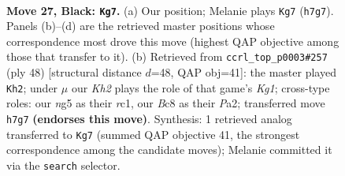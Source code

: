 \documentclass[11pt]{article}
\begin{document}
\clearpage

\begin{figure}[p]\centering
\begin{subfigure}{0.46\textwidth}\centering
\resizebox{\linewidth}{!}{%
\newchessgame
\chessboard[
  setfen={r1b4r/7k/p1n3p1/p3PpNp/n1B2B2/P5P1/1P3P1P/RK1R4 b - - 2 27},
  showmover=false,
  pgfstyle=straightmove, color=movearrow, markmove={h7-g7}
]}
\caption{}
\end{subfigure}\hfill
\begin{subfigure}{0.46\textwidth}\centering
\resizebox{\linewidth}{!}{%
\newchessgame
\chessboard[
  setfen={r4k2/pp2pp2/n5p1/3PNb1p/8/4R1PP/P2RPPB1/2r3K1 w - - 3 25},
  showmover=false,
  pgfstyle=straightmove, color=movearrow, markmove={g1-h2}
]}
\caption{}
\end{subfigure}
\\[4pt]

\caption{\textbf{Move 27, Black: \texttt{Kg7}.} (a) Our position; Melanie plays \texttt{Kg7} (\texttt{h7g7}). Panels (b)--(d) are the retrieved master positions whose correspondence most drove this move (highest QAP objective among those that transfer to it). (b) Retrieved from \texttt{ccrl\_top\_p0003\#257} (ply 48) [structural distance $d$=48, QAP obj=41]: the master played \texttt{Kh2}; under $\mu$ our \emph{Kh2} plays the role of that game's \emph{Kg1}; cross-type roles: our \emph{n}g5 as their \emph{r}c1, our \emph{B}c8 as their \emph{P}a2; transferred move \texttt{h7g7} \textbf{(endorses this move)}. Synthesis: 1 retrieved analog transferred to \texttt{Kg7} (summed QAP objective 41, the strongest correspondence among the candidate moves); Melanie committed it via the \texttt{search} selector.}
\label{fig:thought-m53}
\end{figure}

\clearpage
\end{document}
